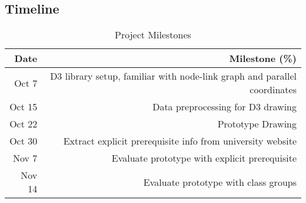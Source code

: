 \subsection{Timeline}
\label{sec:timeline}

\begin{table}[h]
 \caption{Project Milestones}\vspace{1ex} %
 \label{tab:milestones}
 \scriptsize
 \centering %
   \begin{tabular}{r|r}
     Date & Milestone (\%)\\
   \hline
     Oct 7 & D3 library setup, familiar with node-link graph and parallel coordinates\\
     Oct 15 & Data preprocessing for D3 drawing \\
     Oct 22 & Prototype Drawing\\
     Oct 30 & Extract explicit prerequisite info from university website\\
     Nov 7 & Evaluate prototype with explicit prerequisite\\
     Nov 14 & Evaluate prototype with class groups
   \end{tabular}
\end{table}

